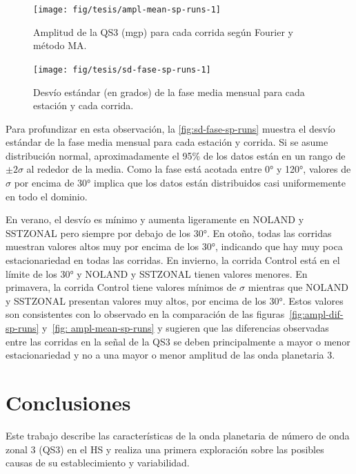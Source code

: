 \documentclass[spanish,a4paper,12pt,oneside]{book}
\begin{document}
\begin{landscape}\begin{figure}

{\centering \texttt{[image: fig/tesis/ampl-mean-sp-runs-1]} 

}

\caption{Amplitud de la QS3 (mgp) para cada corrida según Fourier y método MA.}\label{fig:ampl-mean-sp-runs}
\end{figure}
\end{landscape}

\begin{figure}
\texttt{[image: fig/tesis/sd-fase-sp-runs-1]} \caption{Desvío estándar (en grados) de la fase media mensual para cada estación y cada corrida.}\label{fig:sd-fase-sp-runs}
\end{figure}

Para profundizar en esta observación, la \autoref{fig:sd-fase-sp-runs}
muestra el desvío estándar de la fase media mensual para cada estación y
corrida. Si se asume distribución normal, aproximadamente el 95\% de los
datos están en un rango de \(\pm 2\sigma\) al rededor de la media. Como
la fase está acotada entre 0° y 120°, valores de \(\sigma\) por encima
de 30° implica que los datos están distribuidos casi uniformemente en
todo el dominio.

En verano, el desvío es mínimo y aumenta ligeramente en NOLAND y
SSTZONAL pero siempre por debajo de los 30°. En otoño, todas las
corridas muestran valores altos muy por encima de los 30°, indicando que
hay muy poca estacionariedad en todas las corridas. En invierno, la
corrida Control está en el límite de los 30° y NOLAND y SSTZONAL tienen
valores menores. En primavera, la corrida Control tiene valores mínimos
de \(\sigma\) mientras que NOLAND y SSTZONAL presentan valores muy
altos, por encima de los 30°. Estos valores son consistentes con lo
observado en la comparación de las figuras~\ref{fig:ampl-dif-sp-runs}
y~\ref{fig: ampl-mean-sp-runs} y sugieren que las diferencias observadas
entre las corridas en la señal de la QS3 se deben principalmente a mayor
o menor estacionariedad y no a una mayor o menor amplitud de las onda
planetaria 3.

\chapter{Conclusiones}\label{conclusiones}

Este trabajo describe las características de la onda planetaria de
número de onda zonal 3 (QS3) en el HS y realiza una primera exploración
sobre las posibles causas de su establecimiento y variabilidad.
\end{document}
